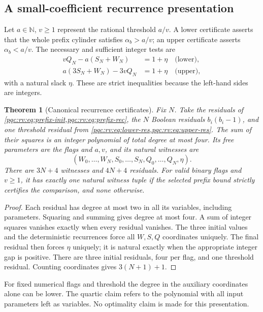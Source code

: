 \documentclass[11pt,letterpaper]{article}
\numberwithin{equation}{section}
\newtheorem{theorem}{Theorem}[section]
\theoremstyle{definition}
\theoremstyle{remark}
\newcommand{\N}{\mathbb N}
\begin{document}
\subsection{A small-coefficient recurrence presentation}
Let $a\in\N$, $v\geq1$ represent the rational threshold $a/v$.
A lower certificate asserts that the whole prefix cylinder satisfies
$\alpha_b>a/v$; an upper certificate asserts $\alpha_b<a/v$.
The necessary and sufficient integer tests are
\begin{align}
 vQ_N-a(S_N+W_N)&=1+\eta \quad\text{(lower)},\label{pqc:rv:eq:lower-res}\\
 a(3S_N+W_N)-3vQ_N&=1+\eta \quad\text{(upper)},\label{pqc:rv:eq:upper-res}
\end{align}
with a natural slack $\eta$. These are strict inequalities because
the left-hand sides are integers.

\begin{theorem}[Canonical recurrence certificates]\label{pqc:rv:thm:quartic-full}
Fix $N$. Take the residuals of \cref{pqc:rv:eq:prefix-init,pqc:rv:eq:prefix-rec},
the $N$ Boolean residuals $b_i(b_i-1)$, and one threshold residual
from \cref{pqc:rv:eq:lower-res,pqc:rv:eq:upper-res}. The sum of their squares is
an integer polynomial of total degree at most four. Its free
parameters are the flags and $a,v$, and its natural witnesses are
\[
 (W_0,\ldots,W_N,S_0,\ldots,S_N,Q_0,\ldots,Q_N,\eta).
\]
There are $3N+4$ witnesses and $4N+4$ residuals. For valid binary
flags and $v\geq1$, it has exactly one natural witness tuple if the
selected prefix bound strictly certifies the comparison, and none
otherwise.
\end{theorem}
\begin{proof}
Each residual has degree at most two in all its variables, including
parameters. Squaring and summing gives degree at most four. A sum of
integer squares vanishes exactly when every residual vanishes.
The three initial values and the deterministic recurrences force
all $W,S,Q$ coordinates uniquely. The final residual then forces
$\eta$ uniquely; it is natural exactly when the appropriate integer
gap is positive. There are three initial residuals, four per flag,
and one threshold residual. Counting coordinates gives $3(N+1)+1$.
\end{proof}

For fixed numerical flags and threshold the degree in the auxiliary
coordinates alone can be lower. The quartic claim refers to the
polynomial with all input parameters left as variables. No optimality
claim is made for this presentation.
\end{document}
